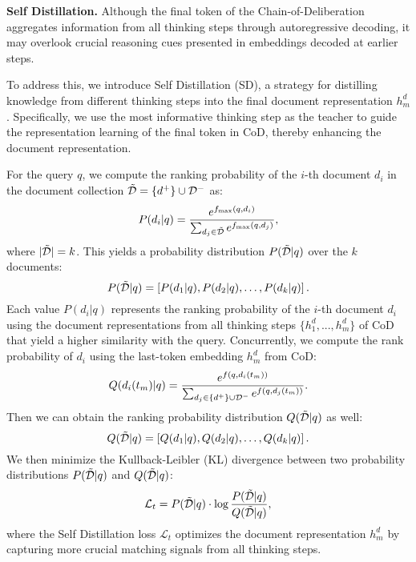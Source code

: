 \textbf{Self Distillation.}
Although the final token of the Chain-of-Deliberation aggregates information from all thinking steps through autoregressive decoding, it may overlook crucial reasoning cues presented in embeddings decoded at earlier steps.

To address this, we introduce Self Distillation (SD), a strategy for distilling knowledge from different thinking steps into the final document representation $h^d_m$. Specifically, we use the most informative thinking step as the teacher to guide the representation learning of the final token in CoD, thereby enhancing the document representation.

For the query $q$, we compute the ranking probability of the $i$-th document $d_i$ in the document collection $\Tilde{\mathcal{D}} = \{d^+\} \cup\mathcal{D}^{-}$ as: 
\begin{equation}\small
P(d_i | q) = \frac{e^{f_\text{max}(q, d_i)}}{\sum_{d_j \in \Tilde{\mathcal{D}}} e^{f_\text{max}(q, d_j)}},
\end{equation}
where $|\Tilde{\mathcal{D}}| = k$. This yields a probability distribution $P(\Tilde{\mathcal{D}}|q)$ over the $k$ documents: 
\begin{equation}\small
P(\Tilde{\mathcal{D}}|q) = \left[ P(d_1 | q), P(d_2 | q), \dots, P(d_k | q) \right].
\end{equation}
Each value $P(d_i | q)$ represents the ranking probability of the $i$-th document $d_i$ using the document representations from all thinking steps $\{h^d_1, ..., h^d_m\}$ of CoD that yield a higher similarity with the query. Concurrently, we compute the rank probability of $d_i$ using the last-token embedding $h^d_m$ from CoD:
\begin{equation}\small
Q(d_i(t_m) | q) = \frac{e^{f(q, d_i(t_m))}}{\sum_{d_j \in \{d^+\} \cup\mathcal{D}^{-}} e^{f(q, d_j(t_m))}}.
\end{equation}
Then we can obtain the ranking probability distribution $Q(\Tilde{\mathcal{D}}|q)$ as well:
\begin{equation}\small
Q(\Tilde{\mathcal{D}}|q) = \left[ Q(d_1 | q), Q(d_2 | q), \dots, Q(d_k | q) \right].
\end{equation}
We then minimize the Kullback-Leibler (KL) divergence between two probability distributions $P(\Tilde{\mathcal{D}}|q)$ and $Q(\Tilde{\mathcal{D}}|q)$:
\begin{equation}\small
\small
\mathcal{L}_{t}={P(\Tilde{\mathcal{D}}|q) \cdot \log  \frac{P(\Tilde{\mathcal{D}}|q)}{Q(\Tilde{\mathcal{D}}|q)}},
\end{equation}
where the Self Distillation loss $\mathcal{L}_{t}$ optimizes the document representation $h_m^d$ by capturing more crucial matching signals from all thinking steps.

